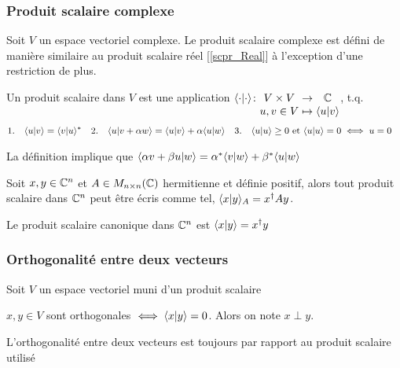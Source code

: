 \subsubsection{Produit scalaire complexe}
Soit $V$ un espace vectoriel complexe. Le produit scalaire complexe est défini de manière
similaire au produit scalaire réel [\ref{scpr_Real}] à l'exception d'une restriction de plus.
\begin{definition}
      Un produit scalaire dans $V$ est une application $\myfunc{\scpr{\cdot}{\cdot}}{V \times V}{\C}{u, v \in V}{\scpr{u}{v}}$, t.q.
      \begin{align*}
            &1. \quad \langle u \lvert v \rangle = \langle v \lvert u \rangle^*& &2. \quad \langle u \lvert v + \alpha w \rangle = \langle u \lvert v \rangle + \alpha \langle u \lvert w \rangle& &3. \quad \langle u \lvert u \rangle \geq 0 \ \text{et} \ \langle u \lvert u \rangle = 0 \iff u = 0&
      \end{align*}
\end{definition}
\begin{remark}
      La définition implique que $\langle \alpha v + \beta u \lvert w \rangle = \alpha^* \langle v \lvert w \rangle + \beta^* \langle u \lvert w \rangle$
\end{remark}
\begin{lemma}
      Soit $x,y \in \mathbb{C}^n$ et $A \in M_{n \times n}(\mathbb{C})$ hermitienne et définie positif, alors tout produit scalaire dans $\mathbb{C}^n$ 
      peut être écris comme tel, $\langle x \lvert y \rangle_A = x^\dagger A y$.
\end{lemma}
\begin{definition}
      Le produit scalaire canonique dans $\mathbb{C}^n$ est $\langle x \lvert y \rangle = x^\dagger y$
\end{definition}

\subsubsection{Orthogonalité entre deux vecteurs}
Soit $V$ un espace vectoriel muni d'un produit scalaire
\begin{definition}
      $x, y \in V$ sont orthogonales $\iff \langle x \lvert y \rangle = 0$. Alors on note $x \perp y$.
\end{definition}
\begin{remark}
      L'orthogonalité entre deux vecteurs est toujours par rapport au produit scalaire utilisé
\end{remark}

